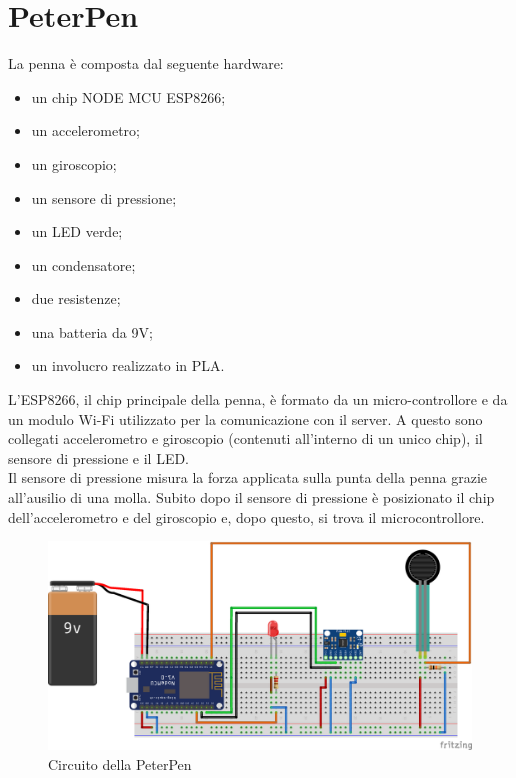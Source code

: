 \documentclass[8pt,notitlepage]{report}
\begin{document}
	\section{PeterPen}
		La penna è composta dal seguente hardware:
		\begin{itemize}
			\setlength\itemsep{.1em}
			\item un chip NODE MCU ESP8266;
			\item un accelerometro;
			\item un giroscopio;
			\item un sensore di pressione;
			\item un LED verde;
			\item un condensatore;
			\item due resistenze;
			\item una batteria da 9V;
			\item un involucro realizzato in PLA.
		\end{itemize}
		L'ESP8266, il chip principale della penna, è formato da un micro-controllore e da un modulo Wi-Fi utilizzato per la comunicazione con il server. A questo sono collegati accelerometro e giroscopio (contenuti all'interno di un unico chip), il sensore di pressione e il LED. \\
		Il sensore di pressione misura la forza applicata sulla punta della penna grazie all'ausilio di una molla. Subito dopo il sensore di pressione è posizionato il chip dell'accelerometro e del giroscopio e, dopo questo, si trova il microcontrollore. \\
		
		\begin{figure}[H]
			\label{figure:circuito}
			\begin{center}
				\includegraphics[scale=.35]{circuito}
				\caption{Circuito della PeterPen}
			\end{center}
		\end{figure}
\end{document}
